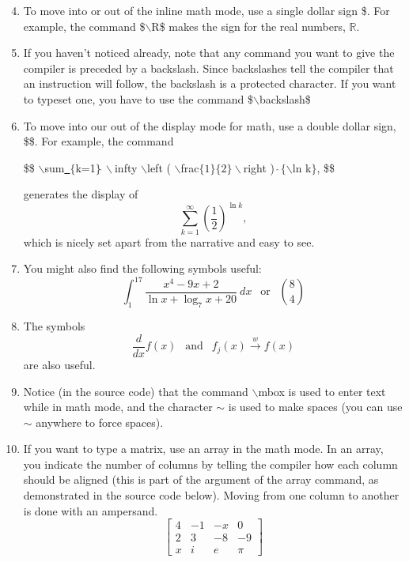 \documentclass[12pt]{report} %
\newcommand{\R}{\mathbb{R}}	%
\begin{document}
\begin{enumerate} 	%
\setcounter{enumi}{3} 

\item To move into or out of the inline math mode, use a single dollar sign \$.  
For example, the command \$$\backslash$R\$ makes the sign for the real 
numbers, $\R$.  


\item If you haven't noticed already, note that any command you want to give the 
compiler is preceded by a backslash.  Since backslashes tell the compiler that an 
instruction will follow, the backslash is a protected character.  If you want to typeset 
one, you have to use the command \$$\backslash$backslash\$

\item To move into our out of the display mode for math, use a double dollar 
sign, \$\$.  For example, the command 
\begin{center}
\$\$ $\backslash$sum\underline{~}$\{$k=1$\}\hat{~}\backslash$infty 
$\backslash$left ( $\backslash$frac$\{1\}\{2\}\backslash$right )
$\hat{~}\{\backslash$ln k$\}$, \$\$  
\end{center}
generates the display of 
$$	%
\sum_{k=1}^\infty \left ( \frac{1}{2} \right )^{\ln k} ,
$$ 	%
which is nicely set apart from the narrative and easy to see.

\item You might also find the following symbols useful:
$$
\int_1^{17} \frac{x^4-9x+2}{\ln x + \log_7 x +20}~dx ~~\mbox{ or }~~
{8 \choose 4} 
$$

\item The symbols
$$
\frac{d}{dx} f(x) ~~\mbox{ and }~~ f_j(x)\stackrel{w}{\rightarrow} f(x)
$$
are also useful.

\item Notice (in the source code) that the command $\backslash$mbox is used to 
enter text while in math mode, and the character $\sim$ is used to make spaces 
(you can use $\sim$ anywhere to force spaces).


\item If you want to type a matrix, use an array in the math mode.  In an array, 
you indicate the number of columns by telling the compiler how each column should 
be aligned (this is part of the argument of the array command, as demonstrated in 
the source code below).  Moving from one column to another is done with an 
ampersand.
\begin{equation} %
\label{ref demo} %
\left [ 
\begin{array}{cclr}
4 & -1 & -x & 0 \\
2 & 3 & -8 & -9 \\
x & i & e & \pi
\end{array}
\right ]
\end{equation} %


\end{enumerate}
\end{document}
